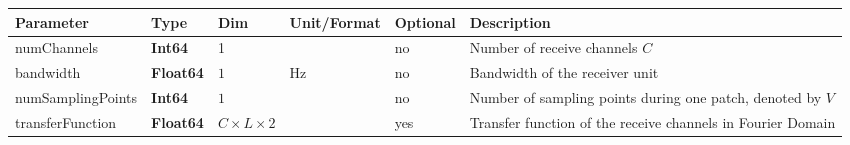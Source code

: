 \documentclass[landscape,a4paper]{article} %
\newcommand{\inltab}[1]{{\ttfamily\bfseries\color{blue}#1}}
\newcommand{\inlvar}[1]{{\ttfamily#1}}
\begin{document}
\noindent \begin{tabularx}{\columnwidth}{lllllX} 
\textbf{Parameter} & \textbf{Type} & \textbf{Dim} & \textbf{Unit/Format} & \textbf{Optional} & \textbf{Description} \\ \hline 
\inlvar{numChannels} & \inltab{Int64} & 1 & & no & Number of receive channels $C$ \\ \hline 
\inlvar{bandwidth} & \inltab{Float64} & $1$ & Hz & no & Bandwidth of the receiver unit \\ \hline
\inlvar{numSamplingPoints} & \inltab{Int64} & $1$ &  & no & Number of sampling points during one patch, denoted by $V$ \\ \hline
\inlvar{transferFunction} & \inltab{Float64} & $C \times L \times 2$ & %
& yes & Transfer function of the receive channels in Fourier Domain \\ \hline
\end{tabularx}
\end{document}
